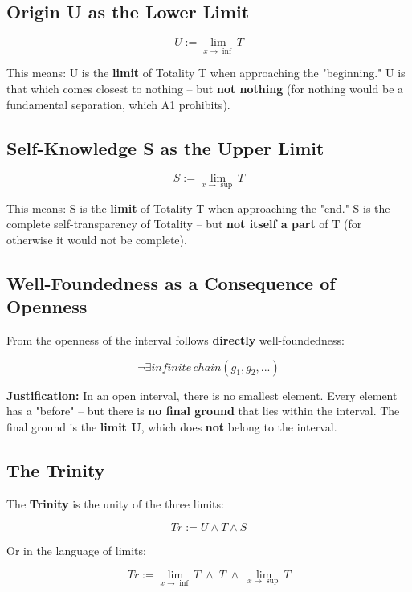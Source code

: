 \documentclass[
]{article}
\begin{document}
\subsection{Origin U as the Lower Limit}\label{origin-u-as-the-lower-limit}

\[
\boxed{U := \lim_{x \to \inf} T}
\]

This means: U is the \textbf{limit} of Totality T when approaching the "beginning." U is that which comes closest to nothing – but \textbf{not nothing} (for nothing would be a fundamental separation, which A1 prohibits).

\subsection{Self-Knowledge S as the Upper Limit}\label{self-knowledge-s-as-the-upper-limit}

\[
\boxed{S := \lim_{x \to \sup} T}
\]

This means: S is the \textbf{limit} of Totality T when approaching the "end." S is the complete self-transparency of Totality – but \textbf{not itself a part} of T (for otherwise it would not be complete).

\subsection{Well-Foundedness as a Consequence of Openness}\label{well-foundedness-as-a-consequence-of-openness}

From the openness of the interval follows \textbf{directly} well-foundedness:

\[
\boxed{\neg\exists infinite\, chain(g_1, g_2, ...)}
\]

\textbf{Justification:} In an open interval, there is no smallest element. Every element has a "before" – but there is \textbf{no final ground} that lies within the interval. The final ground is the \textbf{limit U}, which does \textbf{not} belong to the interval.

\subsection{The Trinity}\label{the-trinity}

The \textbf{Trinity} is the unity of the three limits:

\[
\boxed{Tr := U \land T \land S}
\]

Or in the language of limits:

\[
\boxed{Tr := \lim_{x \to \inf} T \;\land\; T \;\land\; \lim_{x \to \sup} T}
\]
\end{document}
